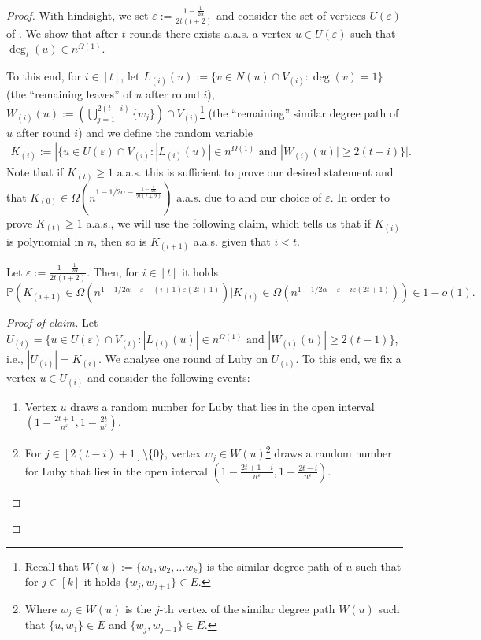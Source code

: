 \documentclass[letterpaper,11pt]{article}
\newcommand{\Pro}[1]{\mathbb{P}\left(#1\right)}
\newcommand{\eps}{\varepsilon}
\newcommand{\aas}{a.a.s.\xspace}
\newcommand{\1}{\mathbb I}
\begin{document}
\begin{proof}
With hindsight, we set $\eps := \frac{1 - \frac{1}{2\alpha}}{2t(t+2)}$ and consider the set of vertices $U(\eps)$ of . We show that after $t$ rounds there exists \aas a vertex $u \in U(\eps)$ such that $\deg_t(u) \in n^{\Omega(1)}$.

To this end, for $i \in [t]$, let $L_{(i)}(u) := \{v \in N(u) \cap V_{(i)} : \deg(v) = 1\}$ (the ``remaining leaves'' of $u$ after round $i$), $W_{(i)}(u):=
\left(\bigcup_{j=1}^{2(t-i)}\{w_j\}\right)\cap V_{(i)}$\footnote{Recall that $W(u) := \{w_1, w_2, \dots w_k\}$ is the similar degree path of $u$ such that for $j \in [k]$ it holds $\{w_{j}, w_{j+1}\} \in E$.} (the ``remaining'' similar degree path of $u$ after round $i$) and we define the random variable
%
\begin{align}
    K_{(i)} := |\{u \in U(\eps) \cap V_{(i)} : |L_{(i)}(u)| \in n^{\Omega(1)} \text{ and } |W_{(i)}(u)| \geq 2(t-i)\}|.  
\end{align}
%
Note that if $K_{(t)} \geq 1$ \aas this is sufficient to prove our desired statement and that $K_{(0)} \in \Omega\left(n^{1 - 1/2\alpha - \frac{1 - \frac{1}{2\alpha}}{2t(t+2)}}\right)$ \aas due to  and our choice of $\eps$. In order to prove $K_{(t)} \geq 1$ \aas, we will use the following claim, which tells us that if $K_{(i)}$ is polynomial in $n$, then so is $K_{(i+1)}$ \aas given that $i < t$.
%
\begin{claim}\label{claim:appendix}
Let $\eps := \frac{1 - \frac{1}{2\alpha}}{2t(t+2)}$. Then, for $i \in [t]$ it holds
%
$$
\Pro{K_{(i+1)} \in \Omega\left(n^{1 - 1/2\alpha - \eps -(i+1)\eps(2t+1)} \right) | K_{(i)} \in  \Omega\left(n^{1 - 1/2\alpha - \eps -i\eps(2t+1)} \right)} \in 1 - o(1).
$$
%
\end{claim}
%
{
\renewcommand{\qedsymbol}{$\blacksquare$} %
\begin{proof}[Proof of claim] 
Let $U_{(i)} = \{u \in U(\eps) \cap V_{(i)} : |L_{(i)}(u)| \in n^{\Omega(1)} \text{ and } |W_{(i)}(u)| \geq 2(t-1)\}$, i.e., $|U_{(i)}| =  K_{(i)}$. We analyse one round of Luby on $U_{(i)}$. To this end, we fix a vertex $u \in U_{(i)}$ and consider the following events:
%
\begin{enumerate}
    \item[($\mathcal{E}_u$)] Vertex $u$ draws a random number for Luby that lies in the open interval $(1- \frac{2t + 1}{n^\eps}, 1- \frac{2t}{n^\eps})$.
    
    \item[($\mathcal{E}_{\text{path}}$)] For $j \in [2(t-i)+1 ]\setminus\{0\}$, vertex $w_j \in W(u)$\footnote{Where $w_j \in W(u)$ is the $j$-th vertex of the similar degree path $W(u)$ such that $\{u, w_1\} \in E$ and  $\{w_j, w_{j+1}\} \in E$.} draws a random number for Luby that lies in the open interval $(1- \frac{2t + 1 -i}{n^\eps}, 1- \frac{2t- i}{n^\eps})$. 
    

\end{enumerate}
\end{proof}}
\end{proof}
\end{document}
